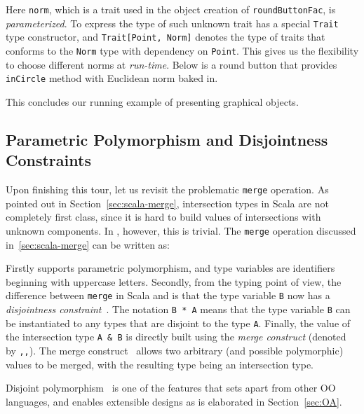 \noindent Here \lstinline{norm}, which is a trait used in the object creation of
\lstinline{roundButtonFac}, is \emph{parameterized}. To express the
type of such unknown trait \name has a special 
\lstinline{Trait} type constructor, and \lstinline$Trait[Point, Norm]$
denotes the type of traits that conforms to the \lstinline$Norm$ type with dependency
on \lstinline{Point}. This gives us the
flexibility to choose different norms at \emph{run-time}. Below is a
round button that provides \lstinline{inCircle} method with Euclidean norm baked
in.

This concludes our running example of presenting graphical objects.

\subsection{Parametric Polymorphism and Disjointness Constraints}
\label{sec:merge-construct}

Upon finishing this tour, let us revisit the problematic \lstinline{merge}
operation. As pointed out in Section~\ref{sec:scala-merge}, intersection types
in Scala are not completely first class, since it is hard to build values of
intersections with unknown components. In \name, however, this is trivial. The
\lstinline{merge} operation discussed in~\ref{sec:scala-merge} can be written as:

\noindent Firstly \name supports parametric polymorphism, and type variables are
identifiers beginning with uppercase letters. Secondly, from the typing point of
view, the difference between \lstinline{merge} in Scala and \name is that the
type variable \lstinline{B} now has a \emph{disjointness
  constraint}~\cite{alpuimdisjoint}. The notation \lstinline{B * A} means that
the type variable \lstinline{B} can be instantiated to any types that are
disjoint to the type \lstinline{A}. Finally, the value of the intersection type
\lstinline{A & B} is directly built using the \textit{merge construct} (denoted
by \lstinline{,,}). The merge construct~\cite{dunfield2014elaborating} allows
two arbitrary (and possible polymorphic) values to be merged, with the resulting type
being an intersection type.

Disjoint polymorphism~\cite{alpuimdisjoint} is one of the features
that sets \name apart
from other OO languages, and enables extensible designs as is elaborated in
Section~\ref{sec:OA}.
